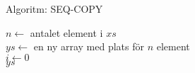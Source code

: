 \begin{Slide}{Algoritm: SEQ-COPY}
\begin{algorithm}[H]
 $n \leftarrow$ antalet element i $xs$ \\
 $ys \leftarrow$ en ny array med plats för $n$ element\\
 $i \leftarrow 0$  \\
 \Return $ys$
\end{algorithm}
\end{Slide}







